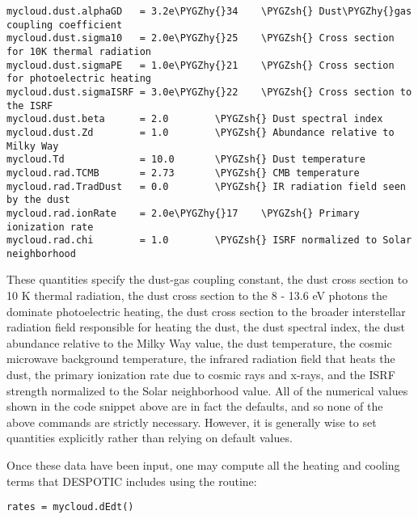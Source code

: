 \documentclass[letterpaper,10pt,english]{sphinxmanual}
\def\PYGZsh{\char`\#}
\def\PYGZhy{\char`\-}
\begin{document}
\begin{Verbatim}[commandchars=\\\{\}]
mycloud.dust.alphaGD   = 3.2e\PYGZhy{}34    \PYGZsh{} Dust\PYGZhy{}gas coupling coefficient
mycloud.dust.sigma10   = 2.0e\PYGZhy{}25    \PYGZsh{} Cross section for 10K thermal radiation
mycloud.dust.sigmaPE   = 1.0e\PYGZhy{}21    \PYGZsh{} Cross section for photoelectric heating
mycloud.dust.sigmaISRF = 3.0e\PYGZhy{}22    \PYGZsh{} Cross section to the ISRF
mycloud.dust.beta      = 2.0        \PYGZsh{} Dust spectral index
mycloud.dust.Zd        = 1.0        \PYGZsh{} Abundance relative to Milky Way
mycloud.Td             = 10.0       \PYGZsh{} Dust temperature
mycloud.rad.TCMB       = 2.73       \PYGZsh{} CMB temperature
mycloud.rad.TradDust   = 0.0        \PYGZsh{} IR radiation field seen by the dust
mycloud.rad.ionRate    = 2.0e\PYGZhy{}17    \PYGZsh{} Primary ionization rate
mycloud.rad.chi        = 1.0        \PYGZsh{} ISRF normalized to Solar neighborhood
\end{Verbatim}

These quantities specify the dust-gas coupling constant, the dust
cross section to 10 K thermal radiation, the dust cross section to the
8 - 13.6 eV photons the dominate photoelectric heating, the dust cross
section to the broader interstellar radiation field responsible for
heating the dust, the dust spectral index, the dust abundance relative
to the Milky Way value, the dust temperature, the cosmic microwave
background temperature, the infrared radiation field that heats the
dust, the primary ionization rate due to cosmic rays and x-rays, and
the ISRF strength normalized to the Solar neighborhood value. All of
the numerical values shown in the code snippet above are in fact the
defaults, and so none of the above commands are strictly
necessary. However, it is generally wise to set quantities explicitly
rather than relying on default values.

Once these data have been input, one may compute all the heating and
cooling terms that DESPOTIC includes using the  routine:

\begin{Verbatim}[commandchars=\\\{\}]
rates = mycloud.dEdt()
\end{Verbatim}
\end{document}

